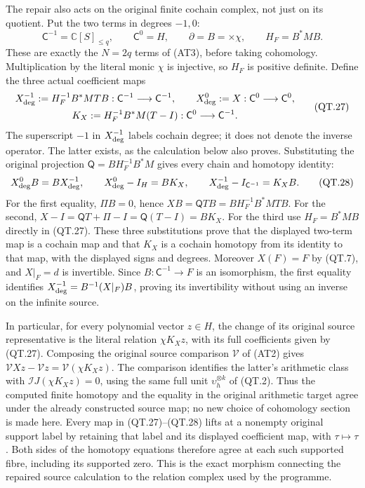 The repair also acts on the original finite cochain complex, not just
on its quotient. Put the two terms in degrees \(-1,0\):
\[
 \mathsf C^{-1}=\mathbb C[S]_{\le q},\qquad
 \mathsf C^0=H,\qquad
 \partial=B=\times\chi,\qquad H_F=B^*MB.
 \]
These are exactly the \(N=2q\) terms of (AT3), before taking
cohomology. Multiplication by the literal monic \(\chi\) is injective,
so \(H_F\) is positive definite. Define the three actual coefficient
maps
\[
 \begin{gathered}
 X^{-1}_{\rm deg}:=H_F^{-1}B^*MTB:
                     \mathsf C^{-1}\longrightarrow\mathsf C^{-1},
 \qquad X^0_{\rm deg}:=X:\mathsf C^0\longrightarrow\mathsf C^0,\\
 K_X:=H_F^{-1}B^*M(T-I):
                     \mathsf C^0\longrightarrow\mathsf C^{-1}.
 \end{gathered}
 \tag{QT.27}\label{eq:qt-chainmaps}
\]
The superscript \(-1\) in \(X^{-1}_{\rm deg}\) labels cochain degree;
it does not denote the inverse operator. The latter exists, as the
calculation below also proves. Substituting the original projection
\(\mathsf Q=BH_F^{-1}B^*M\) gives every chain and homotopy identity:
\[
 X^0_{\rm deg}B=BX^{-1}_{\rm deg},\qquad
 X^0_{\rm deg}-I_H=BK_X,\qquad
 X^{-1}_{\rm deg}-I_{\mathsf C^{-1}}=K_XB.
 \tag{QT.28}\label{eq:qt-chainhomotopy}
\]
For the first equality, \(\Pi B=0\), hence
\(XB=\mathsf QTB=BH_F^{-1}B^*MTB\).
For the second,
\(X-I=\mathsf QT+\Pi-I=\mathsf Q(T-I)=BK_X\).
For the third use \(H_F=B^*MB\) directly in (QT.27).
These three substitutions prove that the displayed two-term map is
a cochain map and that \(K_X\) is a cochain homotopy from its identity
to that map, with the displayed signs and degrees. Moreover
\(X(F)=F\) by (QT.7), and \(X|_F=d\) is invertible. Since
\(B:\mathsf C^{-1}\to F\) is an isomorphism, the first equality
identifies \(X^{-1}_{\rm deg}=B^{-1}(X|_F)B\), proving its
invertibility without using an inverse on the infinite source.

In particular, for every polynomial vector \(z\in H\), the change
of its original source representative is the literal relation
\(\chi K_Xz\), with its full coefficients given by (QT.27).
Composing the original source comparison \(\mathcal V\) of (AT2)
gives
\(\mathcal V Xz-\mathcal V z=\mathcal V(\chi K_Xz)\).
The comparison identifies the latter's arithmetic class with
\(\mathcal I J(\chi K_Xz)=0\), using the same full unit
\(\upsilon_h^{\otimes k}\) of (QT.2). Thus the computed finite
homotopy and the equality in the original arithmetic target agree
under the already constructed source map; no new choice of
cohomology section is made here.
Every map in (QT.27)--(QT.28) lifts at a nonempty original support
label by retaining that label and its displayed coefficient map,
with \(\tau\mapsto\tau\). Both sides of the homotopy equations
therefore agree at each such supported fibre, including its
supported zero. This is the exact morphism connecting the repaired
source calculation to the relation complex used by the programme.
